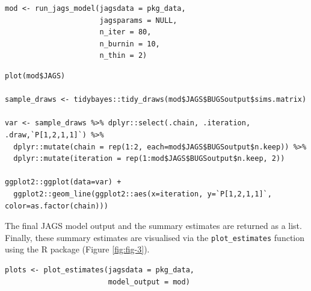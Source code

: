 \begin{verbatim}
mod <- run_jags_model(jagsdata = pkg_data, 
                      jagsparams = NULL,
                      n_iter = 80, 
                      n_burnin = 10, 
                      n_thin = 2)
\end{verbatim}

\begin{verbatim}
plot(mod$JAGS)

sample_draws <- tidybayes::tidy_draws(mod$JAGS$BUGSoutput$sims.matrix)

var <- sample_draws %>% dplyr::select(.chain, .iteration, .draw,`P[1,2,1,1]`) %>%
  dplyr::mutate(chain = rep(1:2, each=mod$JAGS$BUGSoutput$n.keep)) %>%
  dplyr::mutate(iteration = rep(1:mod$JAGS$BUGSoutput$n.keep, 2))

ggplot2::ggplot(data=var) +
  ggplot2::geom_line(ggplot2::aes(x=iteration, y=`P[1,2,1,1]`, color=as.factor(chain)))
\end{verbatim}

The final JAGS model output and the summary estimates are returned as a list. Finally, these summary estimates are visualised via the \texttt{plot\_estimates} function using the R package  (Figure \ref{fig:fig-3}).

\begin{verbatim}
plots <- plot_estimates(jagsdata = pkg_data, 
                        model_output = mod) 
\end{verbatim}



